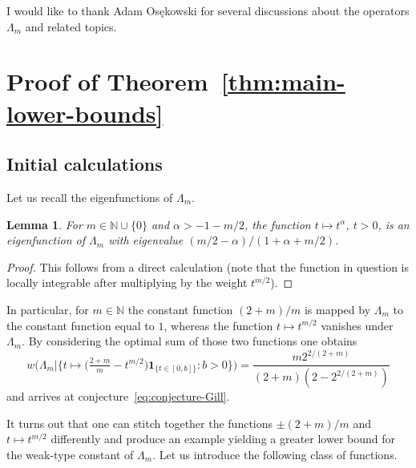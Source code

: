 \documentclass[a4paper]{amsart} %
\newtheorem{lemma}[theorem]{Lemma}
\theoremstyle{definition}
\theoremstyle{remark}
\numberwithin{equation}{section}
\newcommand*{\NNzero}{\mathbb{N}\cup\{0\}}
\newcommand*{\NNone}{\mathbb{N}}
\newcommand*{\ind}[1]{\mathbf{1}_{#1}}
\newcommand*{\indbr}[1]{\ind{\{#1\}}}
\newcommand*{\weakconstrestrictedbig}[2]{w\bigl(#1\big|#2\bigr)} %
\begin{document}
I would like to thank Adam Osękowski for several discussions about the operators $\Lambda_m$ and related topics.

\section{Proof of Theorem~\ref{thm:main-lower-bounds}}

\label{SEC:Lambda}

\subsection{Initial calculations}

\label{sec:initial}

Let us recall the eigenfunctions of $\Lambda_m$.

\begin{lemma}
\label{lem:weak-type-eigenfunctions}
For $m\in\NNzero$ and $\alpha> -1-m/2$, 
the function $t\mapsto t^\alpha$, $t>0$,
is an eigenfunction of $\Lambda_m$ with eigenvalue $(m/2 - \alpha)/(1+\alpha +m/2)$.
\end{lemma}

\begin{proof}
This follows from a direct calculation (note that the function in question is locally integrable after multiplying by the weight $t^{m/2}$).
\end{proof}

In particular, 
for $m\in\NNone$ the constant function $(2+m)/m$ is mapped by $\Lambda_m$ to the constant function equal to $1$,
whereas the function $t\mapsto t^{m/2}$ vanishes under $\Lambda_m$.
By considering the optimal sum of those two functions
one obtains 
\begin{equation}
\label{eq:reason-for-Gill's-conjecture}
\weakconstrestrictedbig{\Lambda_m}{ \bigl\{ t\mapsto \bigl(\tfrac{2+m}{m} - t^{m/2}\bigr)\indbr{t\in[0,b]}  :  b > 0\bigr\} }
=\frac{m 2^{2/(2+m)}}{(2+m)(2-2^{2/(2+m)})} 
\end{equation} 
and arrives at conjecture~\eqref{eq:conjecture-Gill}.


It turns out that one can stitch together the functions $\pm (2+m)/m$ and $t\mapsto t^{m/2}$
differently and produce an example yielding a greater lower bound for the weak-type constant of $\Lambda_m$.
Let us introduce the following class of functions.
\end{document}
